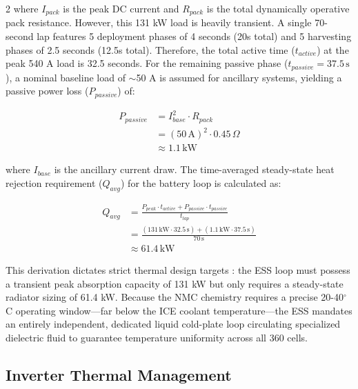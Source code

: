 \begin{multicols}{2}
where $I_{pack}$ is the peak DC current and $R_{pack}$ is the total dynamically operative pack resistance. However, this 131 kW load is heavily transient. A single 70-second lap features 5 deployment phases of 4 seconds (20s total) and 5 harvesting phases of 2.5 seconds (12.5s total). Therefore, the total active time ($t_{active}$) at the peak 540 A load is 32.5 seconds. For the remaining passive phase ($t_{passive} = 37.5\,\mathrm{s}$), a nominal baseline load of $\sim$50 A is assumed for ancillary systems, yielding a passive power loss ($P_{passive}$) of:

\begin{equation} \label{eq:ess_passive_loss}
\begin{split}
P_{passive} &= I^2_{base} \cdot R_{pack} \\
&= (50\,\mathrm{A})^2 \cdot 0.45\,\Omega \\
&\approx 1.1\,\mathrm{kW}
\end{split}
\end{equation}

where $I_{base}$ is the ancillary current draw. The time-averaged steady-state heat rejection requirement ($Q_{avg}$) for the battery loop is calculated as:

\begin{equation} \label{eq:ess_avg_loss}
\begin{split}
Q_{avg} &= \frac{P_{peak} \cdot t_{active} + P_{passive} \cdot t_{passive}}{t_{lap}} \\
&= \frac{(131\,\mathrm{kW} \cdot 32.5\,\mathrm{s}) + (1.1\,\mathrm{kW} \cdot 37.5\,\mathrm{s})}{70\,\mathrm{s}} \\
&\approx 61.4\,\mathrm{kW}
\end{split}
\end{equation}

This derivation dictates strict thermal design targets \cite{battery_thermal_lit}: the ESS loop must possess a transient peak absorption capacity of 131 kW but only requires a steady-state radiator sizing of 61.4 kW. Because the NMC chemistry requires a precise 20-40$^\circ$C operating window—far below the ICE coolant temperature—the ESS mandates an entirely independent, dedicated liquid cold-plate loop circulating specialized dielectric fluid to guarantee temperature uniformity across all 360 cells.

\subsection{Inverter Thermal Management}


\end{multicols}
